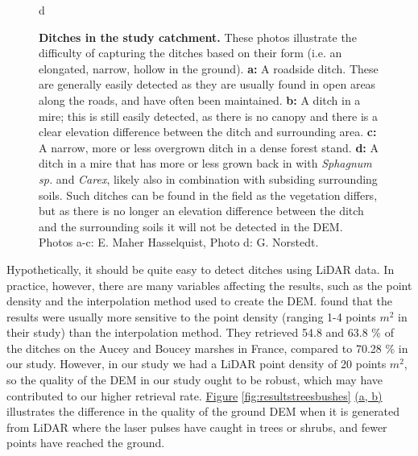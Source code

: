 \documentclass[11pt, review]{elsarticle} %
\begin{document}
\begin{figure} [!htb]
    d{
        }
    \caption{\textbf{Ditches in the study catchment.} These photos illustrate the difficulty of capturing the ditches based on their form (i.e. an elongated, narrow, hollow in the ground). \textbf{a: }A roadside ditch. These are generally easily detected as they are usually found in open areas along the roads, and have often been maintained. \textbf{b: }A ditch in a mire; this is still easily detected, as there is no canopy and there is a clear elevation difference between the ditch and surrounding area. \textbf{c: }A narrow, more or less  overgrown ditch in a dense forest stand. \textbf{d: }A ditch in a mire that has more or less grown back in with \textit{Sphagnum sp.} and \textit{Carex}, likely also in combination with subsiding surrounding soils. Such ditches can be found in the field as the vegetation differs, but as there is no longer an elevation difference between the ditch and the surrounding soils it will not be detected in the DEM. \newline Photos a-c: E. Maher Hasselquist, Photo d: G. Norstedt.}
    \label{fig:ditchpictures}
\end{figure}

Hypothetically, it should be quite easy to detect ditches using LiDAR data. In practice, however, there are many variables affecting the results, such as the point density and the interpolation method used to create the DEM. \citet{rapinel} found that the results were usually more sensitive to the point density (ranging 1-4 points $m^{2}$ in their study) than the interpolation method. They retrieved 54.8 and 63.8 \% of the ditches on the Aucey and Boucey marshes in France, compared to 70.28 \% in our study. However, in our study we had a LiDAR point density of 20 points $m^{2}$, so the quality of the DEM in our study ought to be robust, which may have contributed to our higher retrieval rate. \hyperref[fig:resultstreesbushes]{Figure} \ref{fig:resultstreesbushes} \hyperref[fig:resultstreesbushes]{(a, b)} illustrates the difference in the quality of the ground DEM when it is generated from LiDAR where the laser pulses have caught in trees or shrubs, and fewer points have reached the ground.
\end{document}
